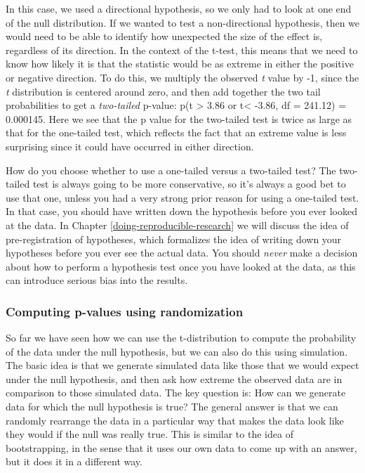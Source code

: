 \documentclass[12pt,]{book}
\theoremstyle{definition}
\theoremstyle{definition}
\theoremstyle{definition}
\theoremstyle{remark}
\begin{document}
In this case, we used a directional hypothesis, so we only had to look at one end of the null distribution. If we wanted to test a non-directional hypothesis, then we would need to be able to identify how unexpected the size of the effect is, regardless of its direction. In the context of the t-test, this means that we need to know how likely it is that the statistic would be as extreme in either the positive or negative direction. To do this, we multiply the observed \emph{t} value by -1, since the \emph{t} distribution is centered around zero, and then add together the two tail probabilities to get a \emph{two-tailed} p-value: p(t \textgreater{} 3.86 or t\textless{} -3.86, df = 241.12) = 0.000145. Here we see that the p value for the two-tailed test is twice as large as that for the one-tailed test, which reflects the fact that an extreme value is less surprising since it could have occurred in either direction.

How do you choose whether to use a one-tailed versus a two-tailed test? The two-tailed test is always going to be more conservative, so it's always a good bet to use that one, unless you had a very strong prior reason for using a one-tailed test. In that case, you should have written down the hypothesis before you ever looked at the data. In Chapter \ref{doing-reproducible-research} we will discuss the idea of pre-registration of hypotheses, which formalizes the idea of writing down your hypotheses before you ever see the actual data. You should \emph{never} make a decision about how to perform a hypothesis test once you have looked at the data, as this can introduce serious bias into the results.

\hypertarget{computing-p-values-using-randomization}{%
\subsubsection{Computing p-values using randomization}\label{computing-p-values-using-randomization}}

So far we have seen how we can use the t-distribution to compute the probability of the data under the null hypothesis, but we can also do this using simulation. The basic idea is that we generate simulated data like those that we would expect under the null hypothesis, and then ask how extreme the observed data are in comparison to those simulated data. The key question is: How can we generate data for which the null hypothesis is true? The general answer is that we can randomly rearrange the data in a particular way that makes the data look like they would if the null was really true. This is similar to the idea of bootstrapping, in the sense that it uses our own data to come up with an answer, but it does it in a different way.
\end{document}
